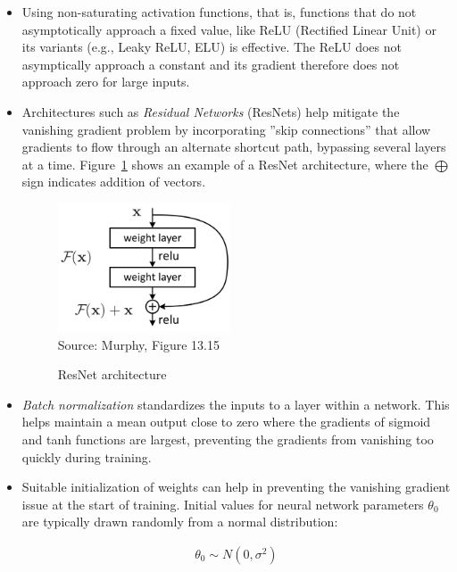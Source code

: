 \begin{itemize}
\item Using non-saturating activation functions, that is, functions that do not asymptotically approach a fixed value, like ReLU (Rectified Linear Unit) or its variants (e.g., Leaky ReLU, ELU) is effective. The ReLU does not asymptically approach a constant and its gradient therefore does not approach zero for large inputs. 

\item Architectures such as \emph{Residual Networks} (ResNets) help mitigate the vanishing gradient problem by incorporating ''skip connections'' that allow gradients to flow through an alternate shortcut path, bypassing several layers at a time. Figure~\ref{fig:resnet} shows an example of a ResNet architecture, where the $\bigoplus$ sign indicates addition of vectors. 

\begin{figure}
\centering
\includegraphics[height=1.5in]{screen8.png} \\

\scriptsize Source: Murphy, Figure 13.15
\caption{ResNet architecture}
\label{fig:resnet}
\end{figure}

\item \emph{Batch normalization} standardizes the inputs to a layer within a network. This helps maintain a mean output close to zero where the gradients of sigmoid and tanh functions are largest, preventing the gradients from vanishing too quickly during training.

\item Suitable initialization of weights can help in preventing the vanishing gradient issue at the start of training. Initial values for neural network parameters $\theta_0$ are typically drawn randomly from a normal distribution:

\begin{align*}
\theta_0 \sim N(0, \sigma^2)
\end{align*}


\end{itemize}
